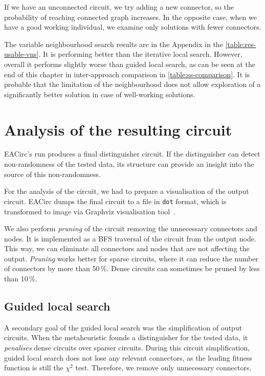 \documentclass[
  print, %
  Table,   %
  nolof,     %
  nolot,     %
  11pt, %
  oneside  %
]{fithesis3}
\begin{document}
If we have an unconnected circuit, we try adding a new connector, so the probability of reaching connected graph increases. In the opposite case, when we have a good working individual, we examine only solutions with fewer connectors.

The variable neighbourhood search results are in the Appendix in the \cref{table:res-usable-vns}. It is performing better than the iterative local search. However, overall it performs slightly worse than guided local search, as can be seen at the end of this chapter in inter-approach comparison in \cref{table:ss-comparison}. It is probable that the limitation of the neighbourhood does not allow exploration of a significantly better solution in case of well-working solutions.


\section{Analysis of the resulting circuit}
\label{sec:res-circ-anal}

EACirc's run produces a final distinguisher circuit. If the distinguisher can detect non-randomness of the tested data, its structure can provide an insight into the source of this non-randomness.

For the analysis of the circuit, we had to prepare a visualisation of the output circuit. EACirc dumps the final circuit to a file in \texttt{dot} format, which is transformed to image via Graphviz visualisation tool~\cite{ellson2001graphviz}.

We also perform \textit{pruning} of the circuit removing the unnecessary connectors and nodes. It is implemented as a BFS traversal of the circuit from the output node. This way, we can eliminate all connectors and nodes that are not affecting the output. \textit{Pruning} works better for sparse circuits, where it can reduce the number of connectors by more than 50\,\%. Dense circuits can sometimes be pruned by less than 10\,\%.

\subsection{Guided local search}
\label{subsec:res-circ-anal-gls}

A secondary goal of the guided local search was the simplification of output circuits. When the metaheuristic founds a distinguisher for the tested data, it \textit{penalises} dense circuits over sparser circuits. During this circuit simplification, guided local search does not lose any relevant connectors, as the leading fitness function is still the $\chi^{2}$ test. Therefore, we remove only unnecessary connectors.
\end{document}
